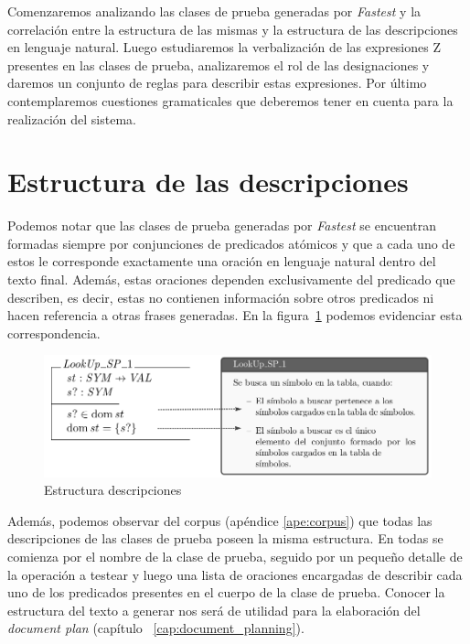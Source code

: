 Comenzaremos analizando las clases de prueba generadas por \emph{Fastest} y la correlación entre la estructura de las mismas y la estructura de las descripciones en lenguaje natural. Luego estudiaremos la verbalización de las expresiones Z presentes en las clases de prueba, analizaremos el rol de las designaciones y daremos un conjunto de reglas para describir estas expresiones. Por último contemplaremos cuestiones gramaticales que deberemos tener en cuenta para la realización del sistema.

\section{Estructura de las descripciones}
\label{sec:corpus_descripciones}
Podemos notar que las clases de prueba generadas por \emph{Fastest} se encuentran formadas siempre por conjunciones de predicados atómicos y que a cada uno de estos le corresponde exactamente una oración en lenguaje natural dentro del texto final. Además, estas oraciones dependen exclusivamente del predicado que describen, es decir, estas no contienen información sobre otros predicados ni hacen referencia a otras frases generadas. En la figura~\ref{fig:ej_test_desc} podemos evidenciar esta correspondencia.

\begin{figure}[H]
\centering
\includegraphics[scale=0.3]{img/ej_test_desc.png}
\caption{Estructura descripciones}
\label{fig:ej_test_desc}
\end{figure}

Además, podemos observar del corpus (apéndice \ref{ape:corpus}) que todas las descripciones de las clases de prueba poseen la misma estructura. En todas se comienza por el nombre de la clase de prueba, seguido por un pequeño detalle de la operación a testear y luego una lista de oraciones encargadas de describir cada uno de los predicados presentes en el cuerpo de la clase de prueba. Conocer la estructura del texto a generar nos será de utilidad para la elaboración del \emph{document plan} (capítulo ~\ref{cap:document_planning}).

